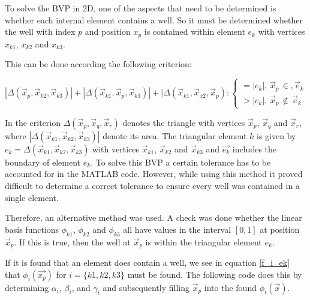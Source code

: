 \documentclass[a4paper]{report}
\begin{document}
To solve the BVP in 2D, one of the aspects that need to be determined is whether each internal element contains a well. So it must be determined whether the well with index $p$ and position $x_p$ is contained within element $e_k$ with vertices $x_{k1}$, $x_{k2}$ and $x_{k3}$. 

This can be done according the following criterion:

\begin{equation}
|\Delta(\vec{x}_p,\vec{x}_{k2},\vec{x}_{k3})|+|\Delta(\vec{x}_{k1},\vec{x}_p,\vec{x}_{k3})|+|\Delta(\vec{x}_{k1},\vec{x}_{x2},\vec{x}_p):
	\begin{cases} 
	=|e_k|,\, \vec{x}_p\, \in, \vec{e}_k\\ 
	>|e_k|,\, \vec{x}_p\, \notin\,\vec{e}_k
	\end{cases} 
\end{equation}

In the criterion $\Delta(\vec{x}_p,\vec{x}_q,\vec{x}_r)$ denotes the triangle with vertices $\vec{x}_p$, $\vec{x}_q$ and $\vec{x}_r$, where $|\Delta(\vec{x}_{k1},\vec{x}_{k2},\vec{x}_{k3})|$ denote its area. The triangular element $k$ is given by $e_k=\Delta(\vec{x}_{k1},\vec{x}_{k2},\vec{x}_{k3})$ with vertices  $\vec{x}_{k1}$, $\vec{x}_{k2}$ and $\vec{x}_{k3}$ and $\vec{e_k}$ includes the boundary of element $e_k$. To solve this BVP a certain tolerance has to be accounted for in the MATLAB code. However, while using this method it proved difficult to determine a correct tolerance to ensure every well was contained in a single element.

Therefore, an alternative method was used. A check was done whether the linear basis functions $\phi_{k1}$, $\phi_{k2}$ and $\phi_{k3}$ all have values in the interval $ [0,1] $ at position $\vec{x}_p$. If this is true, then the well at $\vec{x}_p$ is within the triangular element $e_k$.

If it is found that an element does contain a well, we see in equation \eqref{f_i_ek} that $\phi_i(\vec{x_p})$ for $i = \{k1, k2, k3\}$ must be found. The following code does this by determining $\alpha_i$, $\beta_i$, and $\gamma_i $ and subsequently filling $\vec{x}_p$ into the found $\phi_i(\vec{x})$.
\end{document}

